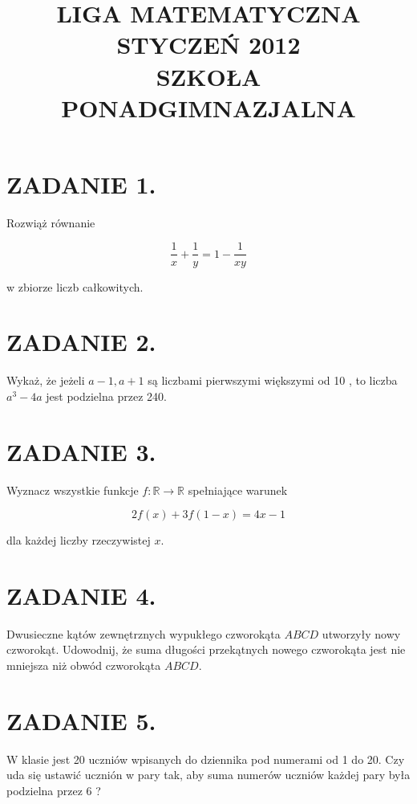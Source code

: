\documentclass[10pt]{article}
\title{LIGA MATEMATYCZNA \\
 STYCZEŃ 2012 \\
 SZKOŁA PONADGIMNAZJALNA }
\author{}
\date{}
\begin{document}
\maketitle
\section*{ZADANIE 1.}
Rozwiąż równanie

\[
\frac{1}{x}+\frac{1}{y}=1-\frac{1}{x y}
\]

w zbiorze liczb całkowitych.

\section*{ZADANIE 2.}
Wykaż, że jeżeli \(a-1, a+1\) są liczbami pierwszymi większymi od 10 , to liczba \(a^{3}-4 a\) jest podzielna przez 240.

\section*{ZADANIE 3.}
Wyznacz wszystkie funkcje \(f: \mathbb{R} \rightarrow \mathbb{R}\) spełniające warunek

\[
2 f(x)+3 f(1-x)=4 x-1
\]

dla każdej liczby rzeczywistej \(x\).

\section*{ZADANIE 4.}
Dwusieczne kątów zewnętrznych wypukłego czworokąta \(A B C D\) utworzyły nowy czworokąt. Udowodnij, że suma długości przekątnych nowego czworokąta jest nie mniejsza niż obwód czworokąta \(A B C D\).

\section*{ZADANIE 5.}
W klasie jest 20 uczniów wpisanych do dziennika pod numerami od 1 do 20. Czy uda się ustawić ucznión w pary tak, aby suma numerów uczniów każdej pary była podzielna przez 6 ?
\end{document}
